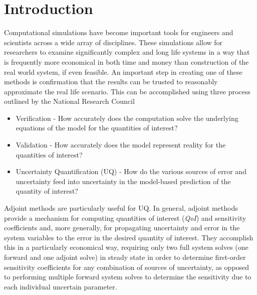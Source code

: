 \documentclass[12pt]{report}
\newcommand{\qoi}{{\it QoI}\xspace}
\begin{document}
\section{Introduction}

Computational simulations have become important tools for engineers and scientists across a wide array of disciplines. These simulations allow for researchers to examine significantly complex and long life systems in a way that is frequently more economical in both time and money than construction of the real world system, if even feasible. An important step in creating one of these methods is confirmation that the results can be trusted to reasonably approximate the real life scenario. This can be accomplished using three process outlined by the National Research Council \cite{NRCVVUQ}


\begin{itemize}
\item Verification - How accurately does the computation solve the underlying equations of the model for the quantities of interest?
\item Validation - How accurately does the model represent reality for the quantities of interest?
\item Uncertainty Quantification (UQ) -  How do the various sources of error and uncertainty feed into uncertainty in the model-based prediction of the quantity of interest?
\end{itemize}


Adjoint methods are particularly useful for UQ. In general, adjoint methods provide a mechanism for computing quantities of interest (\qoi) and sensitivity coefficients and, more generally, for propagating uncertainty and error in the system variables to the error in the desired quantity of interest. They accomplish this in a particularly economical way, requiring only two full system solves (one forward and one adjoint solve) in steady state in order to determine first-order sensitivity coefficients for any combination of sources of uncertainty, as opposed to performing multiple forward system solves to determine
the sensitivity due to each individual uncertain parameter.
\end{document}
